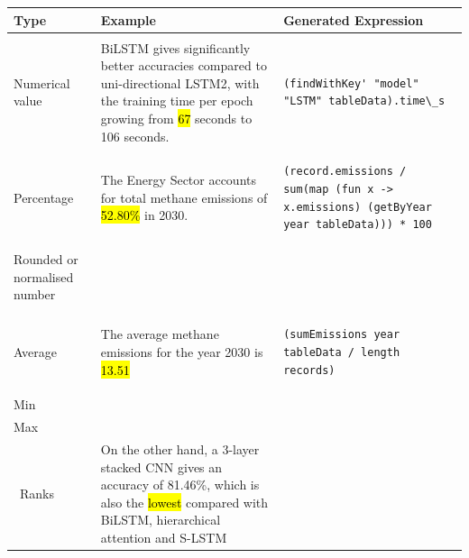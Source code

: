 \begin{table}[!ht]
    \centering
    \footnotesize
    \renewcommand{\arraystretch}{1.5}
    \begin{tabular}{>{\raggedright\arraybackslash}p{2cm} >{\raggedright\arraybackslash}p{5cm} >{\raggedright\arraybackslash}p{6cm}}
        \toprule
        \textbf{Type}                & \textbf{Example} & \textbf{Generated Expression} \\
        \midrule
        \multicolumn{3}{>{\raggedright\arraybackslash}c}{\textbf{Quantitative expressions.}} \\
        \midrule
        Numerical value
        & BiLSTM gives significantly better accuracies compared to uni-directional LSTM2, with the training time per epoch growing from \hl{67} seconds to 106 seconds. &
        \begin{lstlisting}[language=Fluid,numbers=none]
(findWithKey' "model" "LSTM" tableData).time\_s
        \end{lstlisting} \\
        Percentage &
        The Energy Sector accounts for total methane emissions of \hl{52.80\%} in 2030. &
        \begin{lstlisting}[language=Fluid,numbers=none]
(record.emissions / sum(map (fun x -> x.emissions) (getByYear year tableData))) * 100
        \end{lstlisting}  \\
        Rounded or normalised number & ~                & ~                             \\
        \multicolumn{3}{>{\raggedright\arraybackslash}c}{\textbf{Aggregation.}} \\
        \midrule
        Average
        & The average methane emissions for the year 2030 is \hl{13.51} &
        \begin{lstlisting}[language=Fluid,numbers=none]
(sumEmissions year tableData / length records)
        \end{lstlisting} \\
        Min                          & ~                & ~                             \\
        Max                          & ~                & ~                             \\\
        Ranks &
        On the other hand, a 3-layer stacked CNN gives an accuracy of 81.46\%, which is also the \hl{lowest} compared with BiLSTM, hierarchical attention and S-LSTM  &
        \begin{lstlisting}[language=Fluid,numbers=none]

\end{lstlisting}
\end{tabular}
\end{table}
